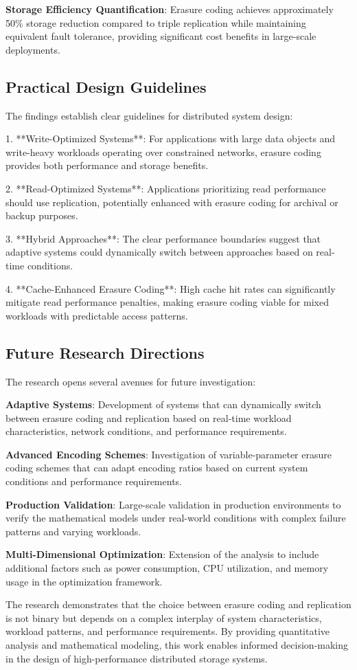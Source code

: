 \textbf{Storage Efficiency Quantification}: Erasure coding achieves approximately 50\% storage reduction compared to triple replication while maintaining equivalent fault tolerance, providing significant cost benefits in large-scale deployments.

\subsection{Practical Design Guidelines}

The findings establish clear guidelines for distributed system design:

1. **Write-Optimized Systems**: For applications with large data objects and write-heavy workloads operating over constrained networks, erasure coding provides both performance and storage benefits.

2. **Read-Optimized Systems**: Applications prioritizing read performance should use replication, potentially enhanced with erasure coding for archival or backup purposes.

3. **Hybrid Approaches**: The clear performance boundaries suggest that adaptive systems could dynamically switch between approaches based on real-time conditions.

4. **Cache-Enhanced Erasure Coding**: High cache hit rates can significantly mitigate read performance penalties, making erasure coding viable for mixed workloads with predictable access patterns.

\subsection{Future Research Directions}

The research opens several avenues for future investigation:

\textbf{Adaptive Systems}: Development of systems that can dynamically switch between erasure coding and replication based on real-time workload characteristics, network conditions, and performance requirements.

\textbf{Advanced Encoding Schemes}: Investigation of variable-parameter erasure coding schemes that can adapt encoding ratios based on current system conditions and performance requirements.

\textbf{Production Validation}: Large-scale validation in production environments to verify the mathematical models under real-world conditions with complex failure patterns and varying workloads.

\textbf{Multi-Dimensional Optimization}: Extension of the analysis to include additional factors such as power consumption, CPU utilization, and memory usage in the optimization framework.

The research demonstrates that the choice between erasure coding and replication is not binary but depends on a complex interplay of system characteristics, workload patterns, and performance requirements. By providing quantitative analysis and mathematical modeling, this work enables informed decision-making in the design of high-performance distributed storage systems.